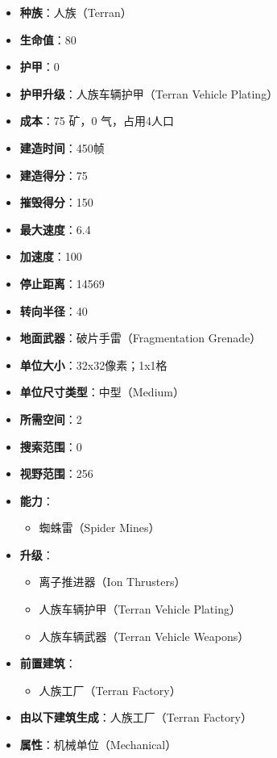 \begin{tcolorbox}[colback=white, colframe=black!60!white, title=Terran\_Vulture(), arc=0mm]
    \begin{itemize}
        \item \textbf{种族}：人族（Terran）
        \item \textbf{生命值}：80
        \item \textbf{护甲}：0
        \item \textbf{护甲升级}：人族车辆护甲（Terran Vehicle Plating）
        \item \textbf{成本}：75 矿，0 气，占用4人口
        \item \textbf{建造时间}：450帧
        \item \textbf{建造得分}：75
        \item \textbf{摧毁得分}：150
        \item \textbf{最大速度}：6.4
        \item \textbf{加速度}：100
        \item \textbf{停止距离}：14569
        \item \textbf{转向半径}：40
        \item \textbf{地面武器}：破片手雷（Fragmentation Grenade）
        \item \textbf{单位大小}：32x32像素；1x1格
        \item \textbf{单位尺寸类型}：中型（Medium）
        \item \textbf{所需空间}：2
        \item \textbf{搜索范围}：0
        \item \textbf{视野范围}：256
        \item \textbf{能力}：
            \begin{itemize}
                \item 蜘蛛雷（Spider Mines）
            \end{itemize}
        \item \textbf{升级}：
            \begin{itemize}
                \item 离子推进器（Ion Thrusters）
                \item 人族车辆护甲（Terran Vehicle Plating）
                \item 人族车辆武器（Terran Vehicle Weapons）
            \end{itemize}
        \item \textbf{前置建筑}：
            \begin{itemize}
                \item 人族工厂（Terran Factory）
            \end{itemize}
        \item \textbf{由以下建筑生成}：人族工厂（Terran Factory）
        \item \textbf{属性}：机械单位（Mechanical）
    \end{itemize}
\end{tcolorbox}

